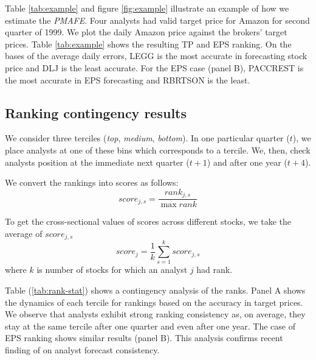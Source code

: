 \documentclass{article}\usepackage[]{graphicx}\usepackage[]{color}
\begin{document}
Table \ref{tab:example} and figure \ref{fig:example} illustrate an example of how we estimate the \textit{PMAFE}. Four analysts had valid target price for Amazon for second quarter of 1999. We plot the daily Amazon price against the brokers' target prices. Table \ref{tab:example} shows the resulting TP and EPS ranking. On the bases of the average daily errors, LEGG is the most accurate in forecasting stock price and  DLJ is the least accurate. For the EPS case (panel B), PACCREST is the most accurate in EPS forecasting and RBRTSON is the least. 


\subsection{Ranking contingency results}
We consider  three terciles (\textit{top}, \textit{medium}, \textit{bottom}). In one particular quarter ($t$), we place  analysts at one of these bins which corresponds to a tercile. We, then,  check analysts position at the immediate next quarter ($t+1$) and after one year ($t+4$).   

We convert the rankings into scores as follows:
\begin{equation}
\label{eq:score}
score_{j,s}=\frac{rank_{j,s}}{\max{rank}}
\end{equation}

To get the cross-sectional values of scores across different stocks, we take the average of $score_{j,s}$
\begin{equation}
\label{eq:mean-score}
score_{j}= \frac{1}{k} \sum_{s=1}^{k} score_{j,s}
\end{equation}
where $k$ is number of stocks for which an analyst $j$ had rank. 

Table (\ref{tab:rank-stat}) shows a contingency analysis of the ranks. 
Panel A shows the dynamics of each tercile for rankings based on the accuracy in target prices. We observe that analysts exhibit strong ranking consistency as, on average, they stay at the same tercile after one quarter and even after one year. The case of EPS ranking shows similar results (panel B). This analysis confirms recent finding of \cite{hilary2013} on analyst forecast consistency. 
\end{document}
